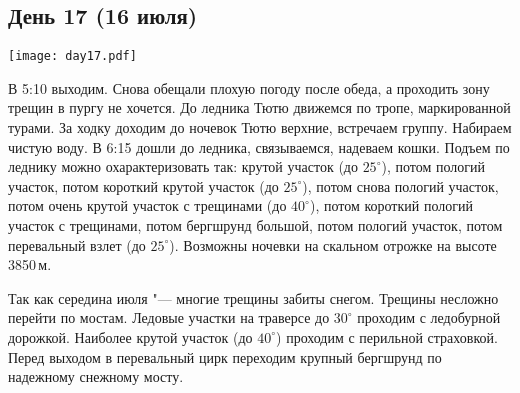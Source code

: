 \graphicspath{{Pictures/Chapter5/Day17}}

\subsection{День 17 (16 июля)}\label{subsec:Day17}
    \parbox[c]{\textwidth}{%
        \texttt{[image: day17.pdf]}\label{fig:Day17_map}%
    }
    \vspace{0.8cm}

    В 5:10 выходим. Снова обещали плохую погоду после обеда, а проходить зону трещин в пургу не хочется. До ледника
    Тютю движемся по тропе, маркированной турами. За ходку доходим до ночевок Тютю верхние, встречаем группу.
    Набираем чистую воду. В 6:15 дошли до ледника, связываемся, надеваем кошки. Подъем по леднику можно
    охарактеризовать так: крутой участок (до $25^\circ$), потом пологий участок, потом короткий крутой участок
    (до $25^\circ$), потом снова пологий участок, потом очень крутой участок с трещинами (до $40^\circ$), потом
    короткий пологий участок с трещинами, потом бергшрунд большой, потом пологий участок, потом перевальный взлет
    (до $25^\circ$). Возможны ночевки на скальном отрожке на высоте 3850\,м.

    Так как середина июля "--- многие трещины забиты снегом. Трещины несложно перейти по мостам. Ледовые участки на
    траверсе до $30^\circ$ проходим с ледобурной дорожкой. Наиболее крутой участок (до $40^\circ$) проходим с
    перильной страховкой. Перед выходом в перевальный цирк переходим крупный бергшрунд по надежному снежному мосту.

